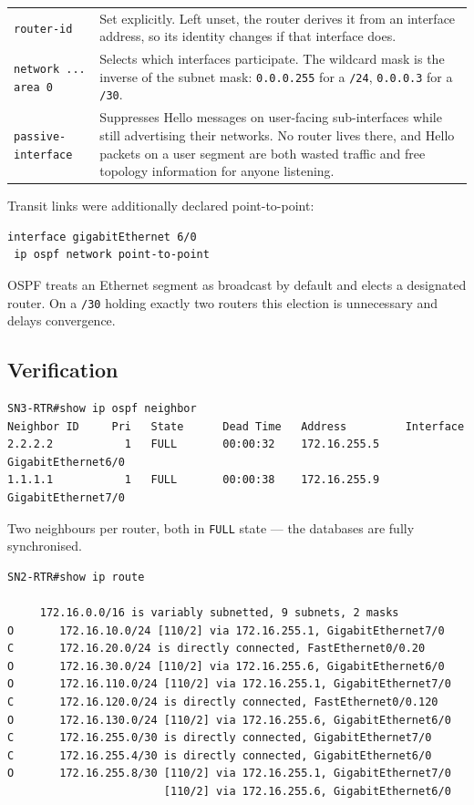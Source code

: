 \documentclass[12pt,a4paper]{article}
\begin{document}
\begin{table}[H]
\centering
\begin{tabular}{@{} l p{9cm} @{}}
\toprule
\texttt{router-id} & Set explicitly. Left unset, the router derives it from an
  interface address, so its identity changes if that interface does. \\
\texttt{network ... area 0} & Selects which interfaces participate. The wildcard
  mask is the inverse of the subnet mask: \texttt{0.0.0.255} for a \texttt{/24},
  \texttt{0.0.0.3} for a \texttt{/30}. \\
\texttt{passive-interface} & Suppresses Hello messages on user-facing
  sub-interfaces while still advertising their networks. No router lives there,
  and Hello packets on a user segment are both wasted traffic and free topology
  information for anyone listening. \\
\bottomrule
\end{tabular}
\end{table}

Transit links were additionally declared point-to-point:

\begin{lstlisting}
interface gigabitEthernet 6/0
 ip ospf network point-to-point
\end{lstlisting}

OSPF treats an Ethernet segment as broadcast by default and elects a designated
router. On a \texttt{/30} holding exactly two routers this election is
unnecessary and delays convergence.

\subsection{Verification}

\begin{lstlisting}
SN3-RTR#show ip ospf neighbor
Neighbor ID     Pri   State      Dead Time   Address         Interface
2.2.2.2           1   FULL       00:00:32    172.16.255.5    GigabitEthernet6/0
1.1.1.1           1   FULL       00:00:38    172.16.255.9    GigabitEthernet7/0
\end{lstlisting}

Two neighbours per router, both in \texttt{FULL} state --- the databases are
fully synchronised.

\begin{lstlisting}
SN2-RTR#show ip route

     172.16.0.0/16 is variably subnetted, 9 subnets, 2 masks
O       172.16.10.0/24 [110/2] via 172.16.255.1, GigabitEthernet7/0
C       172.16.20.0/24 is directly connected, FastEthernet0/0.20
O       172.16.30.0/24 [110/2] via 172.16.255.6, GigabitEthernet6/0
O       172.16.110.0/24 [110/2] via 172.16.255.1, GigabitEthernet7/0
C       172.16.120.0/24 is directly connected, FastEthernet0/0.120
O       172.16.130.0/24 [110/2] via 172.16.255.6, GigabitEthernet6/0
C       172.16.255.0/30 is directly connected, GigabitEthernet7/0
C       172.16.255.4/30 is directly connected, GigabitEthernet6/0
O       172.16.255.8/30 [110/2] via 172.16.255.1, GigabitEthernet7/0
                        [110/2] via 172.16.255.6, GigabitEthernet6/0
\end{lstlisting}
\end{document}
